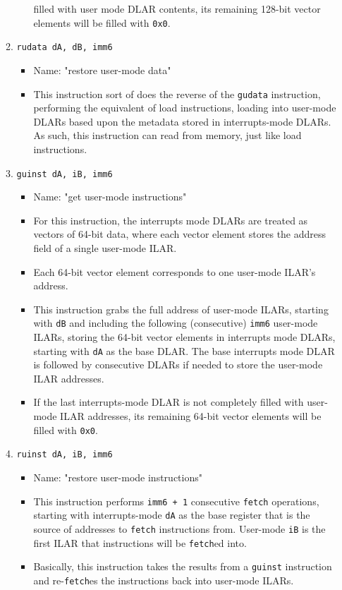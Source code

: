 \documentclass{article}
\begin{document}
\begin{itemize}
\begin{enumerate}
\begin{itemize}
					filled with user mode DLAR contents, its remaining
					128-bit vector elements will be filled with
					\texttt{0x0}.
				\end{itemize}
			\item \texttt{rudata dA, dB, imm6}
				\begin{itemize}
				\item Name:  "restore user-mode data"
				\item This instruction sort of does the reverse of the
					\texttt{gudata} instruction, performing the equivalent
					of load instructions, loading into user-mode DLARs
					based upon the metadata stored in interrupts-mode
					DLARs.  As such, this instruction can read from memory,
					just like load instructions.
				\end{itemize}
			\item \texttt{guinst dA, iB, imm6}
				\begin{itemize}
				\item Name:  "get user-mode instructions"
				\item For this instruction, the interrupts mode DLARs are
					treated as vectors of 64-bit data, where each vector
					element stores the address field of a single user-mode
					ILAR.
				\item Each 64-bit vector element corresponds to one
					user-mode ILAR's address.
				\item This instruction grabs the full address of user-mode
					ILARs, starting with \texttt{dB} and including the
					following (consecutive) \texttt{imm6} user-mode ILARs,
					storing the 64-bit vector elements in interrupts mode
					DLARs, starting with \texttt{dA} as the base DLAR.  The
					base interrupts mode DLAR is followed by consecutive
					DLARs if needed to store the user-mode ILAR addresses.
				\item If the last interrupts-mode DLAR is not completely
					filled with user-mode ILAR addresses, its remaining
					64-bit vector elements will be filled with
					\texttt{0x0}.
				\end{itemize}
			\item \texttt{ruinst dA, iB, imm6}
				\begin{itemize}
				\item Name:  "restore user-mode instructions"
				\item This instruction performs \texttt{imm6 + 1}
					consecutive \texttt{fetch} operations, starting with
					interrupts-mode \texttt{dA} as the base register that
					is the source of addresses to \texttt{fetch}
					instructions from.  User-mode \texttt{iB} is the first
					ILAR that instructions will be \texttt{fetch}ed into.
				\item Basically, this instruction takes the results from
					a \texttt{guinst} instruction and re-\texttt{fetch}es
					the instructions back into user-mode ILARs.
				\end{itemize}



\end{enumerate}
\end{itemize}
\end{document}
